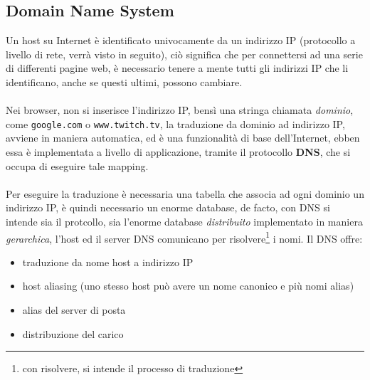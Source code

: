 \documentclass[12pt, letterpaper]{article}
\newcommand{\code}[1]{\colorbox{light-gray}{\texttt{#1}}}
\newcommand{\acc}{\\\hphantom{}\\}
\begin{document}
\subsection{Domain Name System}
Un host su Internet è identificato univocamente da un indirizzo IP (protocollo a livello di rete, verrà
visto in seguito), ciò significa che per connettersi ad una serie di differenti pagine web, è necessario
tenere a mente tutti gli indirizzi IP che li identificano, anche se questi ultimi, possono cambiare.\acc
Nei browser, non si inserisce l'indirizzo IP, bensì una stringa chiamata \textit{dominio}, come
\code{google.com} o \code{www.twitch.tv}, la traduzione da dominio ad indirizzo IP, avviene in maniera automatica,
ed è una funzionalità di base dell'Internet, ebben essa è implementata a livello di applicazione, tramite il
protocollo \textbf{DNS}, che si occupa di eseguire tale mapping.\acc
Per eseguire la traduzione è necessaria una tabella che associa ad ogni dominio un indirizzo IP, è quindi
necessario un enorme database, de facto, con DNS si intende sia il protcollo, sia l'enorme
database \textit{distribuito} implementato in maniera \textit{gerarchica}, l'host ed il server DNS comunicano
per risolvere\footnote{con risolvere, si intende il processo di traduzione} i nomi. Il DNS offre:\begin{itemize}
    \item traduzione da nome host a indirizzo IP
    \item host aliasing (uno stesso host può avere un nome canonico e più nomi alias)
    \item alias del server di posta
    \item distribuzione del carico
\end{itemize}
\end{document}
